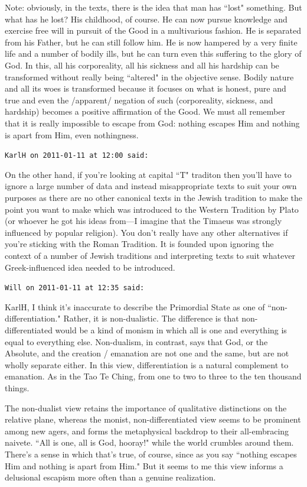 \begin{footnotesize}
\begin{sffamily}
Note: obviously, in the texts, there is the idea that man has ``lost" something. But what has he lost? His childhood, of course. He can now pursue knowledge and exercise free will in pursuit of the Good in a multivarious fashion. He is separated from his Father, but he can still follow him. He is now hampered by a very finite life and a number of bodily ills, but he can turn even this suffering to the glory of God. In this, all his corporeality, all his sickness and all his hardship can be transformed without really being ``altered" in the objective sense. Bodily nature and all its woes is transformed because it focuses on what is honest, pure and true and even the /apparent/ negation of such (corporeality, sickness, and hardship) becomes a positive affirmation of the Good. We must all remember that it is really impossible to escape from God: nothing escapes Him and nothing is apart from Him, even nothingness.


\hfill

\texttt{KarlH on 2011-01-11 at 12:00 said: }

On the other hand, if you're looking at capital ``T" traditon then you'll have to ignore a large number of data and instead misappropriate texts to suit your own purposes as there are no other canonical texts in the Jewish tradition to make the point you want to make which was introduced to the Western Tradition by Plato (or whoever he got his ideas from—I imagine that the Timaeus was strongly influenced by popular religion). You don't really have any other alternatives if you're sticking with the Roman Tradition. It is founded upon ignoring the context of a number of Jewish traditions and interpreting texts to suit whatever Greek-influenced idea needed to be introduced.


\hfill

\texttt{Will on 2011-01-11 at 12:35 said: }

KarlH, I think it's inaccurate to describe the Primordial State as one of ``non-differentiation." Rather, it is non-dualistic. The difference is that non-differentiated would be a kind of monism in which all is one and everything is equal to everything else. Non-dualism, in contrast, says that God, or the Absolute, and the creation / emanation are not one and the same, but are not wholly separate either. In this view, differentiation is a natural complement to emanation. As in the Tao Te Ching, from one to two to three to the ten thousand things.

The non-dualist view retains the importance of qualitative distinctions on the relative plane, whereas the monist, non-differentiated view seems to be prominent among new agers, and forms the metaphysical backdrop to their all-embracing naivete. ``All is one, all is God, hooray!" while the world crumbles around them. There's a sense in which that's true, of course, since as you say ``nothing escapes Him and nothing is apart from Him." But it seems to me this view informs a delusional escapism more often than a genuine realization.


\end{sffamily}
\end{footnotesize}

